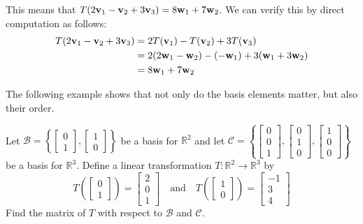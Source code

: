 \documentclass{ximera}
\renewcommand{\vec}[1]{{\bf #1}}
\newcommand{\RR}{\mathbb{R}}
\begin{document}
\begin{example}
\begin{explanation}
This means that $T(2\vec{v}_1-\vec{v}_2+3\vec{v}_3)=8\vec{w}_1+7\vec{w}_2$.
We can verify this by direct computation as follows:
\begin{align*}
T(2\vec{v}_1-\vec{v}_2+3\vec{v}_3)&=2T(\vec{v}_1)-T(\vec{v}_2)+3T(\vec{v}_3)\\&=2(2\vec{w}_1-\vec{w}_2)-(-\vec{w}_1)+3(\vec{w}_1+3\vec{w}_2)\\&=8\vec{w}_1+7\vec{w}_2
\end{align*}
\end{explanation}

\end{example}

The following example shows that not only do the basis elements matter, but also their order.
\begin{example}\label{ex:transmatrix2}
Let $\mathcal{B}=\left\{\begin{bmatrix}0\\1\end{bmatrix},\begin{bmatrix}1\\0\end{bmatrix}\right\}$ be a basis for $\RR^2$ and let $\mathcal{C}=\left\{\begin{bmatrix}0\\0\\1\end{bmatrix},\begin{bmatrix}0\\1\\0\end{bmatrix}, \begin{bmatrix}1\\0\\0\end{bmatrix}\right\}$ be a basis for $\RR^3$.  Define a linear transformation $T:\RR^2\rightarrow \RR^3$ by 
$$T\left(\begin{bmatrix}0\\1\end{bmatrix}\right)=\begin{bmatrix}2\\0\\1\end{bmatrix}\quad\text{and}\quad T\left(\begin{bmatrix}1\\0\end{bmatrix}\right)=\begin{bmatrix}-1\\3\\4\end{bmatrix}$$
Find the matrix of $T$ with respect to $\mathcal{B}$ and $\mathcal{C}$.


\end{example}
\end{document}
